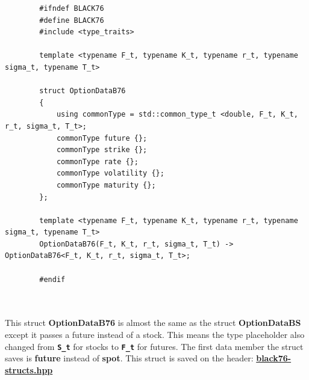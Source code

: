 \documentclass[12pt]{article}
\numberwithin{equation}{section}
\begin{document}
\begin{listing}[ht]
	\begin{verbatim}
		#ifndef BLACK76
		#define BLACK76
		#include <type_traits>
		
		template <typename F_t, typename K_t, typename r_t, typename sigma_t, typename T_t>
		
		struct OptionDataB76
		{
			using commonType = std::common_type_t <double, F_t, K_t, r_t, sigma_t, T_t>;
			commonType future {};
			commonType strike {};
			commonType rate {};
			commonType volatility {};
			commonType maturity {};
		};
		
		template <typename F_t, typename K_t, typename r_t, typename sigma_t, typename T_t>
		OptionDataB76(F_t, K_t, r_t, sigma_t, T_t) -> OptionDataB76<F_t, K_t, r_t, sigma_t, T_t>;
		
		#endif
		
		
	\end{verbatim}
	\caption{Black 76 Option Data Struct}
	\label{black76struct}
\end{listing}

This struct \textbf{OptionDataB76} is almost the same as the struct \textbf{OptionDataBS} except it passes a future instead of a stock. This means the type placeholder also changed from \textbf{\texttt{S\_t}} for stocks to \textbf{\texttt{F\_t}} for futures. The first data member the struct saves is \textbf{future} instead of \textbf{spot}. This struct is saved on the header: \href{https://github.com/neeldevsen/pricingengines/blob/main/I%3A%20European%20Options/Headers/black76_structs.hpp}{\textbf{black76-structs.hpp}}
\end{document}
